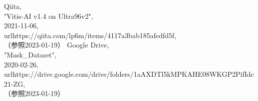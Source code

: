 \documentclass[11pt,a4j]{jreport}
\begin{document}
\begin{thebibliography}{99}
   Qiita, \\"Vitis-AI v1.4 on Ultra96v2", \\2021-11-06, \\url{https://qiita.com/lp6m/items/4117a3bab185afedfd5f}, \\（参照2023-01-19）
   Google Drive, \\"Mask_Dataset", \\2020-02-26, \\url{https://drive.google.com/drive/folders/1aAXDTl5kMPKAHE08WKGP2PifIdc21-ZG}, \\（参照2023-01-19）
\end{thebibliography}
\end{document}
